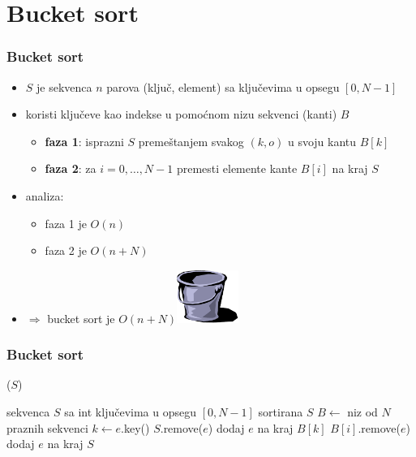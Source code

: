 \documentclass[compress]{beamer}
\begin{document}
\section[Bucket sort]{Bucket sort}

\begin{frame}[fragile]
  \frametitle{Bucket sort}
  \begin{itemize}
    \item $S$ je sekvenca $n$ parova (ključ, element) sa ključevima u opsegu $[0, N-1]$
    \item {} koristi ključeve kao indekse u pomoćnom nizu sekvenci (kanti) $B$
    \begin{itemize}
      \item \textbf{faza 1}: isprazni $S$ premeštanjem svakog $(k,o)$ u svoju kantu $B[k]$ 
      \item \textbf{faza 2}: za $i=0,\ldots,N-1$ premesti elemente kante $B[i]$ na kraj $S$ 
    \end{itemize}
    \item analiza:
    \begin{itemize}
      \item faza 1 je $O(n)$ 
      \item faza 2 je $O(n+N)$ 
    \end{itemize}
    \item $\Rightarrow$ bucket sort je $O(n+N)$\hfill\includegraphics[width=2cm]{asp-12-pic31.png}
  \end{itemize}
\end{frame}

\begin{frame}
  \frametitle{Bucket sort}
  ($S$)
  \begin{algorithmic}
    \REQUIRE sekvenca $S$ sa int ključevima u opsegu $[0,N-1]$
    \ENSURE sortirana $S$
    \STATE $B \leftarrow$ niz od $N$ praznih sekvenci
      \STATE $k \leftarrow e$.key()
      \STATE $S$.remove($e$)
      \STATE dodaj $e$ na kraj $B[k]$ 
    \ENDFOR
        \STATE $B[i]$.remove($e$)
        \STATE dodaj $e$ na kraj $S$
      \ENDFOR
    \ENDFOR
  \end{algorithmic}
\end{frame}
\end{document}

